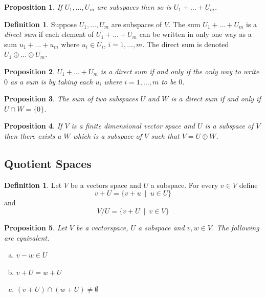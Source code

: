 \documentclass[12pt,letterpaper]{article}
\theoremstyle{plain}
\newtheorem{proposition}{Proposition}[section]
\theoremstyle{definition}
\newtheorem{definition}[theorem]{Definition}
\numberwithin{equation}{section}
\begin{document}
\begin{proposition} If $U_1, \ldots, U_m$ are subspaces then so is $U_1+\ldots+U_m$. 
\end{proposition}

\begin{definition} Suppose $U_1,\ldots, U_m$ are subspaces of $V$. The sum $U_1+\ldots+U_m$ is a \emph{direct sum} if each element of $U_1+\ldots+U_m$ can be written in only one way as a sum $u_1+\ldots +u_m$ where $u_i\in U_i$, $i=1,\ldots,m$. The direct sum is denoted $U_1\oplus \ldots \oplus U_m$. 
\end{definition}

\begin{proposition}  $U_1+\ldots+U_m$ is a direct sum if and only if the only way to write $0$ as a sum is by taking each $u_i$ where $i=1, \ldots, m$ to be $0$. 
\end{proposition}

\begin{proposition}  The sum of two subspaces $U$ and $W$ is a direct sum if and only if\\ $U\cap W=\{0\}$. 
\end{proposition}

\begin{proposition} If $V$ is a finite dimensional vector space and $U$ is a subspace of $V$ then there exists a $W$ which is a subspace of $V$ such that $V=U\oplus W$. 
\end{proposition}

\subsection{Quotient Spaces} 

\begin{definition}Let $V$ be a vectors space and $U$ a subspace. For every $v\in V$ define 
\[v+U=\{v+u\ \mid\  u\in U\}\]
and 
\[V/U=\{v+U\ \mid\  v\in V\}\]
\end{definition}
\begin{proposition}Let $V$ be a vectorspace, $U$ a subspace and $v,w\in V$.  The following are equivalent. 
\begin{enumerate}[(a)]
\item $v-w\in U$
\item $v+U=w+U$
\item $(v+U)\cap (w+U)\neq \emptyset$
\end{enumerate}
\end{proposition}
\end{document}
